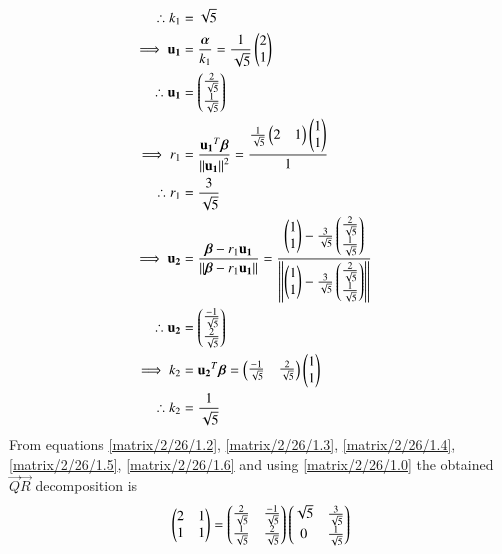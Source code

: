 \begin{enumerate}
\begin{align}
\\
\therefore k_1&=\sqrt{5} \label{matrix/2/26/1.2}
\\
\implies \mathbf{u_1}&=\frac{\boldsymbol{\alpha}}{k_1}=\frac{1}{\sqrt{5}}\begin{pmatrix}2 \\ 1\end{pmatrix}
\\
\therefore \mathbf{u_1}&=\begin{pmatrix}\frac{2}{\sqrt{5}} \\ \frac{1}{\sqrt{5}}\end{pmatrix} \label{matrix/2/26/1.3}
\\
\implies r_1&=\frac{\mathbf{u_1}^{T}{\boldsymbol{\beta}}}{\left\lVert\mathbf{u_1}\right\rVert^2}=\frac{\frac{1}{\sqrt{5}}\begin{pmatrix}2 & 1\end{pmatrix}\begin{pmatrix}1 \\ 1\end{pmatrix}}{1}
\\
\therefore r_1&=\frac{3}{\sqrt{5}} \label{matrix/2/26/1.4}
\\
\implies \mathbf{u_2}&=\frac{\boldsymbol{\beta}-r_1{\mathbf{u_1}}}{\left\lVert\boldsymbol{\beta}-r_1{\mathbf{u_1}}\right\rVert}=\frac{\begin{pmatrix}1\\1\end{pmatrix}-\frac{3}{\sqrt{5}}\begin{pmatrix}\frac{2}{\sqrt{5}} \\ \frac{1}{\sqrt{5}}\end{pmatrix}}{\left\lVert\begin{pmatrix}1\\1\end{pmatrix}-\frac{3}{\sqrt{5}}\begin{pmatrix}\frac{2}{\sqrt{5}} \\ \frac{1}{\sqrt{5}}\end{pmatrix}\right\rVert}
\\
\therefore \mathbf{u_2}&=\begin{pmatrix}\frac{-1}{\sqrt{5}} \\ \frac{2}{\sqrt{5}}\end{pmatrix} \label{matrix/2/26/1.5}
\\
\implies k_2&=\mathbf{u_2}^{T}{\boldsymbol{\beta}}=\begin{pmatrix}\frac{-1}{\sqrt{5}} & \frac{2}{\sqrt{5}}\end{pmatrix}\begin{pmatrix}1 \\ 1\end{pmatrix}
\\
\therefore k_2&=\frac{1}{\sqrt{5}} \label{matrix/2/26/1.6}
\end{align}
From equations \eqref{matrix/2/26/1.2}, \eqref{matrix/2/26/1.3}, \eqref{matrix/2/26/1.4}, \eqref{matrix/2/26/1.5}, \eqref{matrix/2/26/1.6} and using \eqref{matrix/2/26/1.0} the obtained $\vec{Q}\vec{R}$ decomposition is 
\begin{align}
\begin{pmatrix}2 & 1 \\ 1 & 1\end{pmatrix}=\begin{pmatrix}\frac{2}{\sqrt{5}} & \frac{-1}{\sqrt{5}} \\ \frac{1}{\sqrt{5}} & \frac{2}{\sqrt{5}}\end{pmatrix}\begin{pmatrix}\sqrt{5} & \frac{3}{\sqrt{5}} \\ 0 & \frac{1}{\sqrt{5}}\end{pmatrix}
\end{align}
\end{enumerate}